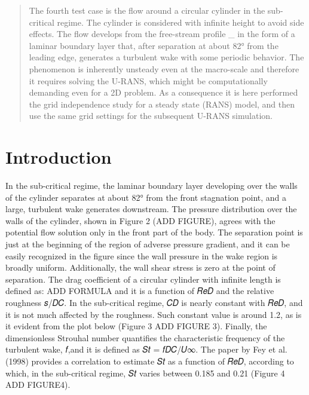 \documentclass[12pt]{article}
\begin{document}
\maketitle

\begin{abstract} 
 The fourth test case is the flow around a circular cylinder in the sub-critical regime. The cylinder is considered with infinite height to avoid side effects. The flow develops from the free-stream profile  _ \infty in the form of a laminar boundary layer that, after separation at about 82° from the leading edge, generates a turbulent wake with some periodic behavior. The phenomenon is inherently unsteady even at the macro-scale and therefore it requires solving the U-RANS, which might be computationally demanding even for a 2D problem. As a consequence it is here performed the grid independence study for a steady state (RANS) model, and then use the same grid settings for the subsequent U-RANS simulation.\cite{FL:01}
\end{abstract}

\section{Introduction}

In the sub-critical regime, the laminar boundary layer developing over the walls of the cylinder separates at about 82° from the front stagnation point, and a large, turbulent wake generates downstream. The pressure distribution over the walls of the cylinder, shown in Figure 2 (ADD FIGURE), agrees with the potential flow solution only in the front part of the body. The separation point is just at the beginning of the region of adverse pressure gradient, and it can be easily recognized in the figure since the wall pressure in the wake region is broadly uniform. Additionally, the wall shear stress is zero at the point of separation.
The drag coefficient of a circular cylinder with infinite length is defined as: ADD FORMULA and it is a function of 𝑅𝑒𝐷 and the relative roughness 𝑠/𝐷𝐶. In the sub-critical regime, 𝐶𝐷 is nearly constant with 𝑅𝑒𝐷, and it is not much affected by the roughness. Such constant value is around 1.2, as is it evident from the plot below (Figure 3 ADD FIGURE 3).
Finally, the dimensionless Strouhal number quantifies the characteristic frequency of the turbulent wake, 𝑓,and it is defined as 𝑆𝑡 = 𝑓𝐷𝐶/𝑈∞. The paper by Fey et al. (1998) provides a correlation to estimate 𝑆𝑡 as a function of 𝑅𝑒𝐷, according to which, in the sub-critical regime, 𝑆𝑡 varies between 0.185 and 0.21 (Figure 4 ADD FIGURE4).
\end{document}
